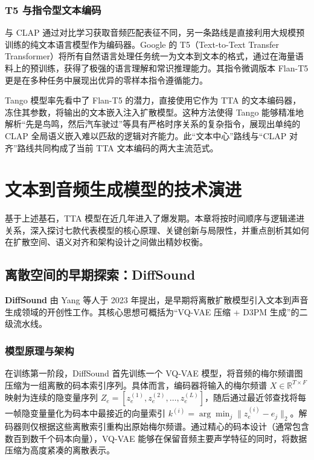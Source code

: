 \documentclass[12pt,a4paper]{article}
\begin{document}
\subsubsection{T5 与指令型文本编码}
与 CLAP 通过对比学习获取音频匹配表征不同，另一条路线是直接利用大规模预训练的纯文本语言模型作为编码器。Google 的 T5（Text-to-Text Transfer Transformer）将所有自然语言处理任务统一为文本到文本的格式，通过在海量语料上的预训练，获得了极强的语言理解和常识推理能力。其指令微调版本 Flan-T5 更是在多种任务中展现出优异的零样本指令遵循能力。

Tango 模型率先看中了 Flan-T5 的潜力，直接使用它作为 TTA 的文本编码器，冻住其参数，将输出的文本嵌入注入扩散模型。这种方法使得 Tango 能够精准地解析“先是鸟鸣，然后汽车驶过”等具有严格时序关系的复杂指令，展现出单纯的 CLAP 全局语义嵌入难以匹敌的逻辑对齐能力。此“文本中心”路线与“CLAP 对齐”路线共同构成了当前 TTA 文本编码的两大主流范式。

\section{文本到音频生成模型的技术演进}

基于上述基石，TTA 模型在近几年进入了爆发期。本章将按时间顺序与逻辑递进关系，深入探讨七款代表模型的核心原理、关键创新与局限性，并重点剖析其如何在扩散空间、语义对齐和架构设计之间做出精妙权衡。

\subsection{离散空间的早期探索：DiffSound}

\textbf{DiffSound} 由 Yang 等人于 2023 年提出，是早期将离散扩散模型引入文本到声音生成领域的开创性工作。其核心思想可概括为“VQ-VAE 压缩 + D3PM 生成”的二级流水线。

\subsubsection{模型原理与架构}
在训练第一阶段，DiffSound 首先训练一个 VQ-VAE 模型，将音频的梅尔频谱图压缩为一组离散的码本索引序列。具体而言，编码器将输入的梅尔频谱 \(X \in \mathbb{R}^{T \times F}\) 映射为连续的隐变量序列 \(Z_e = [z_e^{(1)}, z_e^{(2)}, \dots, z_e^{(L)}]\)，随后通过最近邻查找将每一帧隐变量量化为码本中最接近的向量索引 \(k^{(i)} = \arg\min_j \| z_e^{(i)} - e_j \|_2\)。解码器则仅根据这些离散索引重构出原始梅尔频谱。通过精心的码本设计（通常包含数百到数千个码本向量），VQ-VAE 能够在保留音频主要声学特征的同时，将数据压缩为高度紧凑的离散表示。
\end{document}
